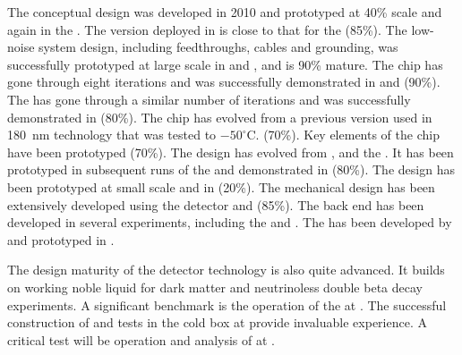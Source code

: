 The  conceptual design was developed in 2010 and prototyped
at 40\% scale and again in the . The version deployed in
 is close to that for the  (85\%). The
 low-noise system design, including feedthroughs, cables and
grounding, was successfully prototyped at large scale in
 and , and is 90\% mature. The
 chip has gone through eight iterations and was successfully
demonstrated in  and  (90\%). The
 has gone through a similar number of iterations and was
successfully demonstrated in  (80\%). The  chip
has evolved from a previous version used in  180~nm
technology that was tested to $-50^\circ$C. (70\%). Key elements of
the  chip have been prototyped (70\%). The 
design has evolved from ,  and the
.  It has been prototyped in subsequent runs of the
 and demonstrated in  (80\%). The 
 design has been prototyped at small scale and in
 (20\%). The mechanical design has been extensively
developed using the  detector and  (85\%). The
  back end has been developed in several
experiments, including the  and . The
   has been developed by
 and prototyped in .

The design maturity of the  detector technology is also
quite advanced. It builds on working noble liquid  for
dark matter and neutrinoless double beta decay experiments. A
significant benchmark is the operation of the  at
. The successful construction of  and tests in
the cold box at  provide invaluable experience. A critical
test will be operation and analysis of  at
.

